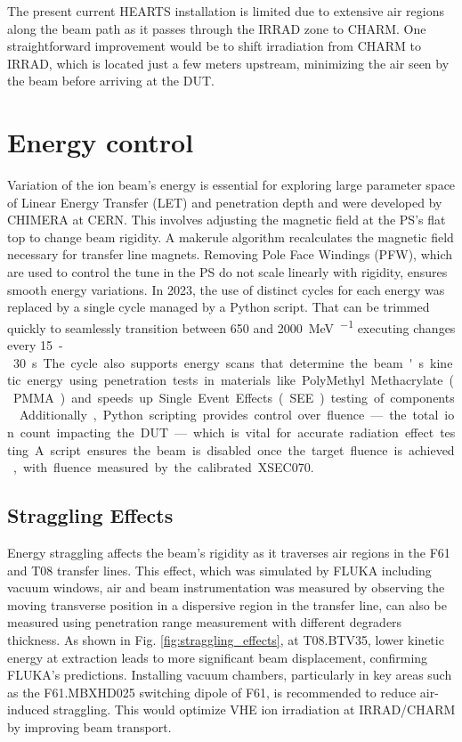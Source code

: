 \documentclass[a4paper,
               biblatex,     %
               ]{jacow}
\begin{document}
The present current HEARTS installation is limited due to extensive air regions along the beam path as it passes through the IRRAD zone to CHARM. One straightforward improvement would be to shift irradiation from CHARM to IRRAD, which is located just a few meters upstream, minimizing the air seen by the beam before arriving at the DUT.






\section{Energy control}

Variation of the ion beam’s energy is essential for exploring large parameter space of Linear Energy Transfer (LET) and penetration depth and were developed by CHIMERA at CERN. This involves adjusting the magnetic field at the PS's flat top to change beam rigidity. A makerule algorithm recalculates the magnetic field necessary for transfer line magnets. Removing Pole Face Windings (PFW), which are used to control the tune in the PS do not scale linearly with rigidity, ensures smooth energy variations. In 2023, the use of distinct cycles for each energy was replaced by a single cycle managed by a Python script. That can be trimmed quickly to seamlessly transition between \SI{650}{} and \SI{2000}{\mega\electronvolt\per\nucleon} executing changes every \SI{15}-\SI{30}{\second}. The cycle also supports energy scans that determine the beam's kinetic energy using penetration tests in materials like PolyMethyl Methacrylate (PMMA) and speeds up Single Event Effects (SEE) testing of components \cite{noauthor_hearts_nodate}. Additionally, Python scripting provides control over fluence—the total ion count impacting the DUT—which is vital for accurate radiation effect testing. A script ensures the beam is disabled once the target fluence is achieved, with fluence measured by the calibrated XSEC070.

\subsection{Straggling Effects}
Energy straggling affects the beam's rigidity as it traverses air regions in the F61 and T08 transfer lines. This effect, which was simulated by FLUKA including vacuum windows, air and beam instrumentation \cite{battistoni_overview_2015} was measured by observing the moving transverse position in a dispersive region in the transfer line, can also be measured using penetration range measurement with different degraders thickness. As shown in Fig. \ref{fig:straggling_effects}, at T08.BTV35, lower kinetic energy at extraction leads to more significant beam displacement, confirming FLUKA's predictions. Installing vacuum chambers, particularly in key areas such as the F61.MBXHD025 switching dipole of F61, is recommended to reduce air-induced straggling. This would optimize VHE ion irradiation at IRRAD/CHARM by improving beam transport.
\end{document}
